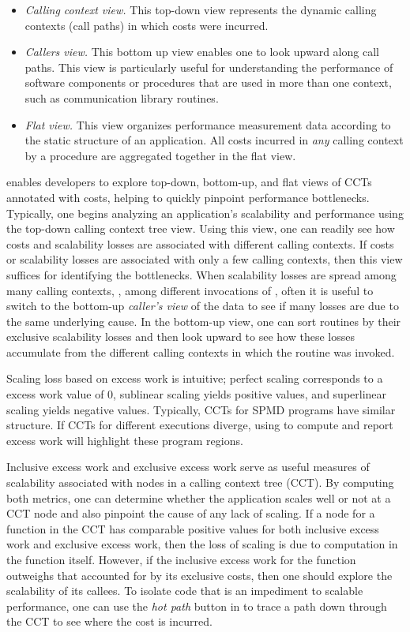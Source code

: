 \documentclass[11pt,letterpaper]{report}
\begin{document}
\begin{itemize}
\item {\em Calling context view.} This top-down view represents the dynamic calling contexts (call paths) in which costs were incurred. 

\item {\em Callers view.} This bottom up view enables one to look upward along call paths. This view is particularly useful for understanding the performance of software components or procedures that are used in more than one context, such as communication library routines.

\item {\em Flat view.} This view organizes performance measurement data according to the static structure of an application. All costs incurred in {\em any} calling context by a procedure are aggregated together in the flat view. 
\end{itemize}

\hpcviewer{} enables developers to explore top-down, bottom-up, and flat views of CCTs annotated with costs, helping to quickly pinpoint performance bottlenecks.
Typically, one begins analyzing an application's scalability and performance using the top-down calling context tree view.
Using this view, one can readily see how costs and scalability losses are associated with different calling contexts.
If costs or scalability losses are associated with only a few calling contexts, then this view suffices for identifying the bottlenecks.
When scalability losses are spread among many calling contexts, \eg, among different invocations of , often it is useful to switch to the bottom-up {\em caller's view} of the data to see if many losses are due to the same underlying cause.
In the bottom-up view, one can sort routines by their exclusive scalability losses and then look upward to see how these losses accumulate from the different calling contexts in which the routine was invoked.

Scaling loss based on excess work is intuitive; perfect scaling corresponds to a excess work value of $0$, sublinear scaling yields positive values, and superlinear scaling yields negative values.
Typically, CCTs for SPMD programs have similar structure.
If CCTs for different executions diverge, using \hpcviewer{} to compute and report excess work will highlight these program regions.

Inclusive excess work and exclusive excess work serve as useful measures of scalability associated with nodes in a calling context tree (CCT).
By computing both metrics, one can determine whether the application scales well or not at a CCT node and also pinpoint the cause of any lack of scaling.
If a node for a function in the CCT has comparable positive values for both inclusive excess work and exclusive excess work, then the loss of scaling is due to computation in the function itself.
However, if the inclusive excess work for the function outweighs that accounted for by its exclusive costs, then one should explore the scalability of its callees.
To isolate code that is an impediment to scalable performance, one can use the {\em hot path} button in \hpcviewer{} to trace a path down through the CCT to see where the cost is incurred.
\end{document}
